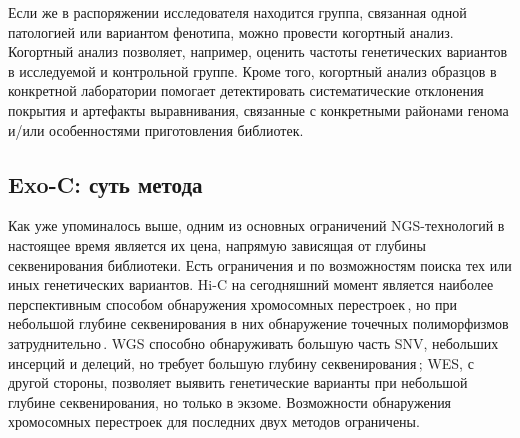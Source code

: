 \documentclass[a4paper,14pt]{extarticle}
\newcommand{\ecitep}[1]{\textenglish{\citep{#1}}}
\begin{document}
Если же в распоряжении исследователя находится группа, связанная одной патологией или вариантом фенотипа, можно провести когортный анализ.
Когортный анализ позволяет, например, оценить частоты генетических вариантов в исследуемой и контрольной группе.
Кроме того, когортный анализ образцов в конкретной лаборатории помогает детектировать систематические отклонения покрытия и артефакты выравнивания, связанные с конкретными районами генома и/или особенностями приготовления библиотек.

%
%

\subsection{Exo-C: суть метода}

Как уже упоминалось выше, одним из основных ограничений NGS\hyp{}технологий в настоящее время является их цена, напрямую зависящая от глубины секвенирования библиотеки.
Есть ограничения и по возможностям поиска тех или иных генетических вариантов.
Hi-C на сегодняшний момент является наиболее перспективным способом обнаружения хромосомных перестроек\,\ecitep{Melo_2020}, но при небольшой глубине секвенирования в них обнаружение точечных полиморфизмов затруднительно\,\ecitep{Sims_2014}.
WGS способно обнаруживать большую часть SNV, небольших инсерций и делеций, но требует большую глубину секвенирования\,\ecitep{Sims_2014}; WES, с другой стороны, позволяет выявить генетические варианты при небольшой глубине секвенирования, но только в экзоме.
Возможности обнаружения хромосомных перестроек для последних двух методов ограничены.
\end{document}
